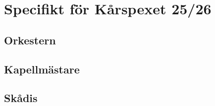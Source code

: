 \chapter{Specifikt för Kårspexet 25/26}
\section{Orkestern}
\section{Kapellmästare}
\section{Skådis}
